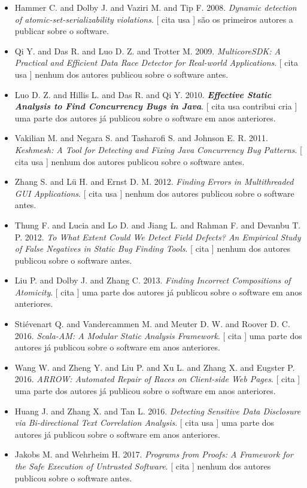 \begin{itemize}
\item Hammer C. and Dolby J. and Vaziri M. and Tip F.
      2008.
        \textit{ Dynamic detection of atomic-set-serializability violations}.
      [
          cita
          usa
      ]
são os primeiros autores a publicar sobre o software.
\item Qi Y. and Das R. and Luo D. Z. and Trotter M.
      2009.
        \textit{ MulticoreSDK: A Practical and Efficient Data Race Detector for Real-world Applications}.
      [
          cita
          usa
      ]
nenhum dos autores publicou sobre o software antes.
\item Luo D. Z. and Hillis L. and Das R. and Qi Y.
      2010.
        \textbf{\textit{ Effective Static Analysis to Find Concurrency Bugs in Java}}.
      [
          cita
          usa
          contribui
          cria
      ]
uma parte dos autores já publicou sobre o software em anos anteriores.
\item Vakilian M. and Negara S. and Tasharofi S. and Johnson E. R.
      2011.
        \textit{ Keshmesh: A Tool for Detecting and Fixing Java Concurrency Bug Patterns}.
      [
          cita
          usa
      ]
nenhum dos autores publicou sobre o software antes.
\item Zhang S. and L\"{u} H. and Ernst D. M.
      2012.
        \textit{ Finding Errors in Multithreaded GUI Applications}.
      [
          cita
          usa
      ]
nenhum dos autores publicou sobre o software antes.
\item Thung F. and Lucia and Lo D. and Jiang L. and Rahman F. and Devanbu T. P.
      2012.
        \textit{ To What Extent Could We Detect Field Defects? An Empirical Study of False Negatives in Static Bug Finding Tools}.
      [
          cita
      ]
nenhum dos autores publicou sobre o software antes.
\item Liu P. and Dolby J. and Zhang C.
      2013.
        \textit{ Finding Incorrect Compositions of Atomicity}.
      [
          cita
      ]
uma parte dos autores já publicou sobre o software em anos anteriores.
\item Stiévenart Q. and Vandercammen M. and Meuter D. W. and Roover D. C.
      2016.
        \textit{ Scala-AM: A Modular Static Analysis Framework}.
      [
          cita
      ]
uma parte dos autores já publicou sobre o software em anos anteriores.
\item Wang W. and Zheng Y. and Liu P. and Xu L. and Zhang X. and Eugster P.
      2016.
        \textit{ ARROW: Automated Repair of Races on Client-side Web Pages}.
      [
          cita
      ]
uma parte dos autores já publicou sobre o software em anos anteriores.
\item Huang J. and Zhang X. and Tan L.
      2016.
        \textit{ Detecting Sensitive Data Disclosure via Bi-directional Text Correlation Analysis}.
      [
          cita
          usa
      ]
uma parte dos autores já publicou sobre o software em anos anteriores.
\item Jakobs M. and Wehrheim H.
      2017.
        \textit{ Programs from Proofs: A Framework for the Safe Execution of Untrusted Software}.
      [
          cita
      ]
nenhum dos autores publicou sobre o software antes.
\end{itemize}
